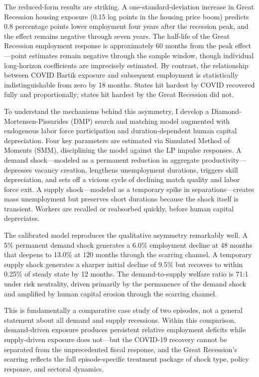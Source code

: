 \documentclass[12pt]{article}
\begin{document}
The reduced-form results are striking. A one-standard-deviation increase in Great Recession housing exposure (0.15 log points in the housing price boom) predicts 0.8 percentage points lower employment four years after the recession peak, and the effect remains negative through seven years. The half-life of the Great Recession employment response is approximately 60 months from the peak effect---point estimates remain negative through the sample window, though individual long-horizon coefficients are imprecisely estimated. By contrast, the relationship between COVID Bartik exposure and subsequent employment is statistically indistinguishable from zero by 18 months. States hit hardest by COVID recovered fully and proportionally; states hit hardest by the Great Recession did not.

To understand the mechanisms behind this asymmetry, I develop a Diamond-Mortensen-Pissarides (DMP) search and matching model augmented with endogenous labor force participation and duration-dependent human capital depreciation. Four key parameters are estimated via Simulated Method of Moments (SMM), disciplining the model against the LP impulse responses. A demand shock---modeled as a permanent reduction in aggregate productivity---depresses vacancy creation, lengthens unemployment durations, triggers skill depreciation, and sets off a vicious cycle of declining match quality and labor force exit. A supply shock---modeled as a temporary spike in separations---creates mass unemployment but preserves short durations because the shock itself is transient. Workers are recalled or reabsorbed quickly, before human capital depreciates.

The calibrated model reproduces the qualitative asymmetry remarkably well. A 5\% permanent demand shock generates a 6.0\% employment decline at 48 months that deepens to 13.0\% at 120 months through the scarring channel. A temporary supply shock generates a sharper initial decline of 9.5\% but recovers to within 0.25\% of steady state by 12 months. The demand-to-supply welfare ratio is 71:1 under risk neutrality, driven primarily by the permanence of the demand shock and amplified by human capital erosion through the scarring channel.

This is fundamentally a comparative case study of two episodes, not a general statement about all demand and supply recessions. Within this comparison, demand-driven exposure produces persistent relative employment deficits while supply-driven exposure does not---but the COVID-19 recovery cannot be separated from the unprecedented fiscal response, and the Great Recession's scarring reflects the full episode-specific treatment package of shock type, policy response, and sectoral dynamics.
\end{document}
